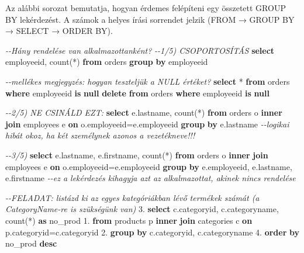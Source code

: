 \documentclass[
  magyar,
]{article}
\newenvironment{Shaded}{}{}
\newcommand{\CommentTok}[1]{\textcolor[rgb]{0.38,0.63,0.69}{\textit{#1}}}
\newcommand{\FloatTok}[1]{\textcolor[rgb]{0.25,0.63,0.44}{#1}}
\newcommand{\FunctionTok}[1]{\textcolor[rgb]{0.02,0.16,0.49}{#1}}
\newcommand{\KeywordTok}[1]{\textcolor[rgb]{0.00,0.44,0.13}{\textbf{#1}}}
\newcommand{\NormalTok}[1]{#1}
\newcommand{\OperatorTok}[1]{\textcolor[rgb]{0.40,0.40,0.40}{#1}}
\begin{document}
Az alábbi sorozat bemutatja, hogyan érdemes felépíteni egy összetett
GROUP BY lekérdezést. A számok a helyes írási sorrendet jelzik (FROM →
GROUP BY → SELECT → ORDER BY).

\begin{Shaded}
\begin{Highlighting}[]
\CommentTok{{-}{-}Hány rendelése van alkalmazottanként?}
\CommentTok{{-}{-}1/5) CSOPORTOSÍTÁS}
\KeywordTok{select}\NormalTok{ employeeid, }\FunctionTok{count}\NormalTok{(}\OperatorTok{*}\NormalTok{)}
\KeywordTok{from}\NormalTok{ orders}
\KeywordTok{group} \KeywordTok{by}\NormalTok{ employeeid}

\CommentTok{{-}{-}mellékes megjegyzés: hogyan teszteljük a NULL értéket?}
\KeywordTok{select} \OperatorTok{*} \KeywordTok{from}\NormalTok{ orders }\KeywordTok{where}\NormalTok{ employeeid }\KeywordTok{is} \KeywordTok{null}
\KeywordTok{delete} \KeywordTok{from}\NormalTok{ orders }\KeywordTok{where}\NormalTok{ employeeid }\KeywordTok{is} \KeywordTok{null}

\CommentTok{{-}{-}2/5) NE CSINÁLD EZT:}
\KeywordTok{select}\NormalTok{ e.lastname, }\FunctionTok{count}\NormalTok{(}\OperatorTok{*}\NormalTok{)}
\KeywordTok{from}\NormalTok{ orders o }\KeywordTok{inner} \KeywordTok{join}\NormalTok{ employees e }\KeywordTok{on}\NormalTok{ o.employeeid}\OperatorTok{=}\NormalTok{e.employeeid}
\KeywordTok{group} \KeywordTok{by}\NormalTok{ e.lastname}
\CommentTok{{-}{-}logikai hibát okoz, ha két személynek azonos a vezetékneve!!!}

\CommentTok{{-}{-}3/5)}
\KeywordTok{select}\NormalTok{ e.lastname, e.firstname, }\FunctionTok{count}\NormalTok{(}\OperatorTok{*}\NormalTok{)}
\KeywordTok{from}\NormalTok{ orders o }\KeywordTok{inner} \KeywordTok{join}\NormalTok{ employees e }\KeywordTok{on}\NormalTok{ o.employeeid}\OperatorTok{=}\NormalTok{e.employeeid}
\KeywordTok{group} \KeywordTok{by}\NormalTok{ e.employeeid, e.lastname, e.firstname}
\CommentTok{{-}{-}ez a lekérdezés kihagyja azt az alkalmazottat, akinek nincs rendelése}

\CommentTok{{-}{-}FELADAT: listázd ki az egyes kategóriákban lévő termékek számát (a CategoryName{-}re is szükségünk van)}
\FloatTok{3.} \KeywordTok{select}\NormalTok{ c.categoryid, c.categoryname, }\FunctionTok{count}\NormalTok{(}\OperatorTok{*}\NormalTok{) }\KeywordTok{as}\NormalTok{ no\_prod}
\FloatTok{1.} \KeywordTok{from}\NormalTok{ products p }\KeywordTok{inner} \KeywordTok{join}\NormalTok{ categories c }\KeywordTok{on}\NormalTok{ p.categoryid}\OperatorTok{=}\NormalTok{c.categoryid}
\FloatTok{2.} \KeywordTok{group} \KeywordTok{by}\NormalTok{ c.categoryid, c.categoryname}
\FloatTok{4.} \KeywordTok{order} \KeywordTok{by}\NormalTok{ no\_prod }\KeywordTok{desc}


\end{Highlighting}
\end{Shaded}
\end{document}
